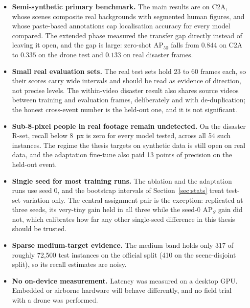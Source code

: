 \documentclass[12pt,a4paper,oneside]{report}
\begin{document}
\begin{itemize}
  \item \textbf{Semi-synthetic primary benchmark.} The main results are on
        C2A, whose scenes composite real backgrounds with segmented human
        figures, and whose paste-based annotations cap localisation accuracy
        for every model compared. The extended phase measured the transfer
        gap directly instead of leaving it open, and the gap is large:
        zero-shot $\mathrm{AP}_{50}$ falls from $0.844$ on C2A to $0.335$ on
        the drone test and $0.133$ on real disaster frames.
  \item \textbf{Small real evaluation sets.} The real test sets hold 23 to
        60 frames each, so their scores carry wide intervals and should be
        read as evidence of direction, not precise levels. The within-video
        disaster result also shares source videos between training and
        evaluation frames, deliberately and with de-duplication; the honest
        cross-event number is the held-out one, and it is not significant.
  \item \textbf{Sub-8-pixel people in real footage remain undetected.} On
        the disaster R-set, recall below 8~px is zero for every model
        tested, across all 54 such instances. The regime the thesis targets
        on synthetic data is still open on real data, and the adaptation
        fine-tune also paid 13 points of precision on the held-out event.
  \item \textbf{Single seed for most training runs.} The ablation and the
        adaptation runs use seed 0, and the bootstrap intervals of
        Section~\ref{sec:stats} treat test-set variation only. The central
        assignment pair is the exception: replicated at three seeds, its
        very-tiny gain held in all three while the seed-0 $\mathrm{AP}_S$
        gain did not, which calibrates how far any other single-seed
        difference in this thesis should be trusted.
  \item \textbf{Sparse medium-target evidence.} The medium band holds only
        317 of roughly 72{,}500 test instances on the official split (410 on
        the scene-disjoint split), so its recall estimates are noisy.
  \item \textbf{No on-device measurement.} Latency was measured on a desktop
        GPU. Embedded or airborne hardware will behave differently, and no
        field trial with a drone was performed.
\end{itemize}
\end{document}
